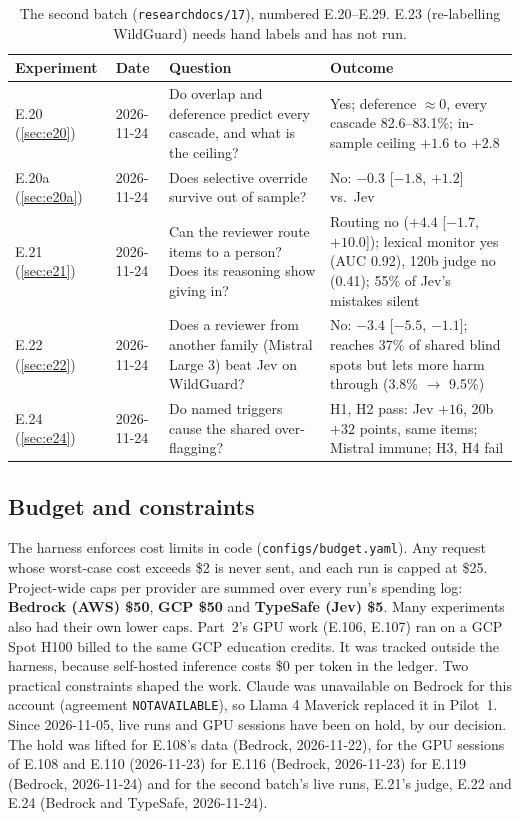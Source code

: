 \documentclass[11pt]{article}
\renewcommand{\_}{\origunderscore\allowbreak}
\begin{document}
\begin{table}[H]
\centering
\footnotesize
\begin{tabularx}{\textwidth}{@{}p{1.8cm}p{1.6cm}p{4.4cm}X@{}}
\toprule
Experiment & Date & Question & Outcome \\
\midrule
E.20 (\ref{sec:e20}) & 2026-11-24 & Do overlap and deference predict every cascade, and what is the ceiling? & Yes; deference $\approx 0$, every cascade 82.6--83.1\%; in-sample ceiling $+1.6$ to $+2.8$ \\
E.20a (\ref{sec:e20a}) & 2026-11-24 & Does selective override survive out of sample? & No: $-0.3$ [$-1.8$, $+1.2$] vs.\ Jev \\
E.21 (\ref{sec:e21}) & 2026-11-24 & Can the reviewer route items to a person? Does its reasoning show giving in? & Routing no ($+4.4$ [$-1.7$, $+10.0$]); lexical monitor yes (AUC 0.92), 120b judge no (0.41); 55\% of Jev's mistakes silent \\
E.22 (\ref{sec:e22}) & 2026-11-24 & Does a reviewer from another family (Mistral Large 3) beat Jev on WildGuard? & No: $-3.4$ [$-5.5$, $-1.1$]; reaches 37\% of shared blind spots but lets more harm through (3.8\% $\to$ 9.5\%) \\
E.24 (\ref{sec:e24}) & 2026-11-24 & Do named triggers cause the shared over-flagging? & H1, H2 pass: Jev $+16$, 20b $+32$ points, same items; Mistral immune; H3, H4 fail \\
\bottomrule
\end{tabularx}
\caption{The second batch (\texttt{research\_docs/17}), numbered E.20--E.29. E.23 (re-labelling WildGuard) needs hand labels and has not run.}
\label{tab:intro-roadmap2}
\end{table}

\subsection{Budget and constraints}\label{sec:budget}

The harness enforces cost limits in code (\texttt{configs/budget.yaml}). Any request whose worst-case cost exceeds \$2 is never sent, and each run is capped at \$25. Project-wide caps per provider are summed over every run's spending log: \textbf{Bedrock (AWS) \$50}, \textbf{GCP \$50} and \textbf{TypeSafe (Jev) \$5}. Many experiments also had their own lower caps. Part~2's GPU work (E.106, E.107) ran on a GCP Spot H100 billed to the same GCP education credits. It was tracked outside the harness, because self-hosted inference costs \$0 per token in the ledger. Two practical constraints shaped the work. Claude was unavailable on Bedrock for this account (agreement \texttt{NOT\_AVAILABLE}), so Llama 4 Maverick replaced it in Pilot~1. Since 2026-11-05, live runs and GPU sessions have been on hold, by our decision. The hold was lifted for E.108's data (Bedrock, 2026-11-22), for the GPU sessions of E.108 and E.110 (2026-11-23) for E.116 (Bedrock, 2026-11-23) for E.119 (Bedrock, 2026-11-24) and for the second batch's live runs, E.21's judge, E.22 and E.24 (Bedrock and TypeSafe, 2026-11-24).
\end{document}
